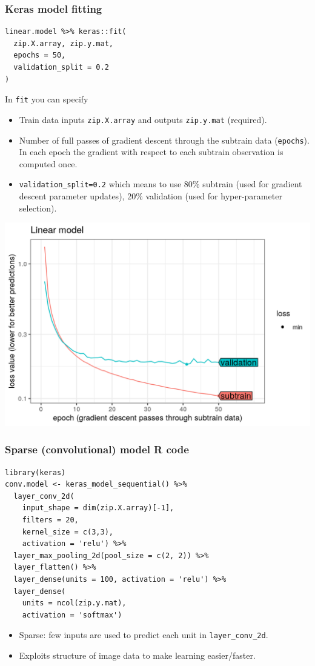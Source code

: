 \documentclass{beamer}
\begin{document}
\begin{frame}[fragile]
\frametitle{Keras model fitting}
\begin{verbatim}
linear.model %>% keras::fit(
  zip.X.array, zip.y.mat,
  epochs = 50,
  validation_split = 0.2
)
\end{verbatim}
In \texttt{fit} you can specify
\begin{itemize}
\item Train data inputs \texttt{zip.X.array} and outputs
  \texttt{zip.y.mat} (required).
\item Number of full passes of gradient descent through the subtrain
  data (\texttt{epochs}). In each epoch the gradient with respect to
  each subtrain observation is computed once.
\item \texttt{validation\_split=0.2} which means to use 80\% subtrain
  (used for gradient descent parameter updates), 20\% validation (used
  for hyper-parameter selection). 
\end{itemize}
\end{frame}
 
\begin{frame}
  \includegraphics[width=\textwidth]{figure-validation-loss-linear}
\end{frame}
 
\begin{frame}[fragile]
  \frametitle{Sparse (convolutional) model R code}

\begin{verbatim}
library(keras)
conv.model <- keras_model_sequential() %>%
  layer_conv_2d(
    input_shape = dim(zip.X.array)[-1],
    filters = 20,
    kernel_size = c(3,3),
    activation = 'relu') %>% 
  layer_max_pooling_2d(pool_size = c(2, 2)) %>%
  layer_flatten() %>%
  layer_dense(units = 100, activation = 'relu') %>% 
  layer_dense(
    units = ncol(zip.y.mat), 
    activation = 'softmax')
\end{verbatim}

  \begin{itemize}
  \item Sparse: few inputs are used to predict each unit in
    \texttt{layer\_conv\_2d}.
  \item Exploits structure of image data to make learning
    easier/faster.
  \end{itemize}

\end{frame}
 
\end{document}
